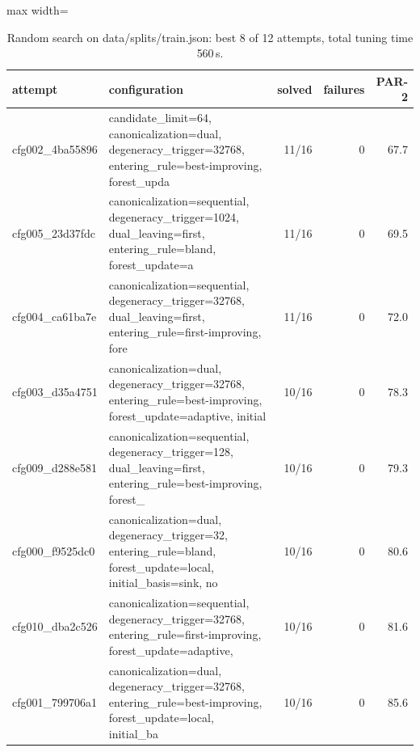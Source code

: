 \begin{table}[tbp]
\centering
\caption{Random search on data/splits/train.json: best 8 of 12 attempts, total tuning time 560\,s.}
\label{tab:tuning-forest-v2}
\small
\begin{adjustbox}{max width=\textwidth}
\begin{tabular}{llrrr}
\toprule
attempt & configuration & solved & failures & PAR-2 \\
\midrule
cfg002\_4ba55896 & \footnotesize candidate\_limit=64, canonicalization=dual, degeneracy\_trigger=32768, entering\_rule=best-improving, forest\_upda & 11/16 & 0 & 67.7 \\
cfg005\_23d37fdc & \footnotesize canonicalization=sequential, degeneracy\_trigger=1024, dual\_leaving=first, entering\_rule=bland, forest\_update=a & 11/16 & 0 & 69.5 \\
cfg004\_ca61ba7e & \footnotesize canonicalization=sequential, degeneracy\_trigger=32768, dual\_leaving=first, entering\_rule=first-improving, fore & 11/16 & 0 & 72.0 \\
cfg003\_d35a4751 & \footnotesize canonicalization=dual, degeneracy\_trigger=32768, entering\_rule=best-improving, forest\_update=adaptive, initial & 10/16 & 0 & 78.3 \\
cfg009\_d288e581 & \footnotesize canonicalization=sequential, degeneracy\_trigger=128, dual\_leaving=first, entering\_rule=best-improving, forest\_ & 10/16 & 0 & 79.3 \\
cfg000\_f9525dc0 & \footnotesize canonicalization=dual, degeneracy\_trigger=32, entering\_rule=bland, forest\_update=local, initial\_basis=sink, no & 10/16 & 0 & 80.6 \\
cfg010\_dba2c526 & \footnotesize canonicalization=sequential, degeneracy\_trigger=32768, entering\_rule=first-improving, forest\_update=adaptive,  & 10/16 & 0 & 81.6 \\
cfg001\_799706a1 & \footnotesize canonicalization=dual, degeneracy\_trigger=32768, entering\_rule=best-improving, forest\_update=local, initial\_ba & 10/16 & 0 & 85.6 \\
\bottomrule
\end{tabular}
\end{adjustbox}
\end{table}
